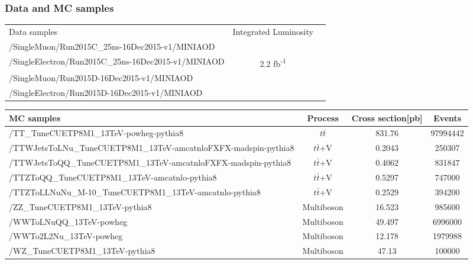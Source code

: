 \documentclass{beamer}
\begin{document}
\begin{frame}
\frametitle{Data and MC samples}
    \begin{table}[t]
 \vspace{-2.5pt}
      \setlength{\tabcolsep}{1.0pt}
      \tiny
          \begin{tabular}{!{\color{purple}\vrule}l!{\color{purple}\vrule}c!{\color{purple}\vrule}c!{\color{purple}\vrule}}
\hline
\toprule
Data samples &  Integrated Luminosity\\
\hline %
\toprule
/SingleMuon/Run2015C\_25ns-16Dec2015-v1/MINIAOD & {}\\
/SingleElectron/Run2015C\_25ns-16Dec2015-v1/MINIAOD & 2.2 fb\textsuperscript{-1}\\
/SingleMuon/Run2015D-16Dec2015-v1/MINIAOD & {}\\
/SingleElectron/Run2015D-16Dec2015-v1/MINIAOD & {}\\
\toprule
\end{tabular}
\end{table}
    \begin{table}[t]
 \vspace{-8.5pt}
      \setlength{\tabcolsep}{1.0pt}
       \tiny
          \begin{tabular}{!{\color{purple}\vrule}l!{\color{purple}\vrule}c!{\color{purple}\vrule}c!{\color{purple}\vrule}c!{\color{purple}\vrule}}%
          \hline
           \toprule
MC samples &  Process & Cross section[pb] & Events\\
\toprule
\tiny
/TT\_TuneCUETP8M1\_13TeV-powheg-pythia8 & $t\bar{t}$ & 831.76 & 97994442\\
/TTWJetsToLNu\_TuneCUETP8M1\_13TeV-amcatnloFXFX-madspin-pythia8 & $t\bar{t}$+V & 0.2043 & 250307\\
/TTWJetsToQQ\_TuneCUETP8M1\_13TeV-amcatnloFXFX-madspin-pythia8 & $t\bar{t}$+V & 0.4062 & 831847\\
/TTZToQQ\_TuneCUETP8M1\_13TeV-amcatnlo-pythia8 & $t\bar{t}$+V & 0.5297 & 747000\\
/TTZToLLNuNu\_M-10\_TuneCUETP8M1\_13TeV-amcatnlo-pythia8 & $t\bar{t}$+V & 0.2529 & 394200\\
/ZZ\_TuneCUETP8M1\_13TeV-pythia8 & Multiboson & 16.523 & 985600\\
/WWToLNuQQ\_13TeV-powheg & Multiboson & 49.497 & 6996000\\
/WWTo2L2Nu\_13TeV-powheg & Multiboson & 12.178 & 1979988\\
/WZ\_TuneCUETP8M1\_13TeV-pythia8 & Multiboson & 47.13 & 100000\\

\end{tabular}
\end{table}
\end{frame}
\end{document}
